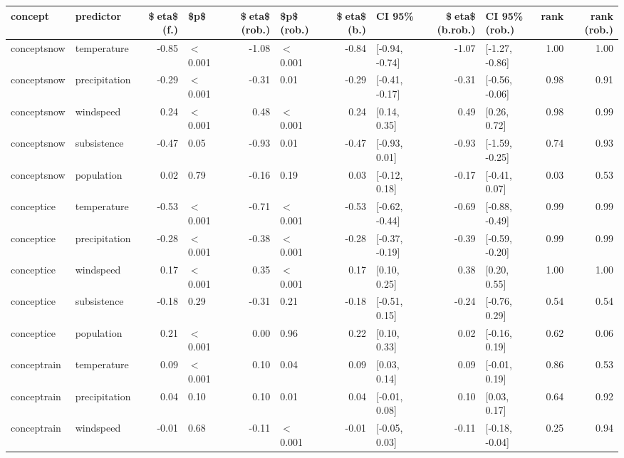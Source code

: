 \begin{table}[ht]
\centering
\begin{tabular}{llrlrlrlrlrr}
  \hline
concept & predictor & \$eta\$ (f.) & \$p\$ & \$eta\$ (rob.) & \$p\$ (rob.) & \$eta\$ (b.) & CI 95\% & \$eta\$ (b.rob.) & CI 95\% (rob.) & rank & rank (rob.) \\ 
  \hline
conceptsnow & temperature & -0.85 & $<$ 0.001 & -1.08 & $<$ 0.001 & -0.84 & [-0.94, -0.74] & -1.07 & [-1.27, -0.86] & 1.00 & 1.00 \\ 
  conceptsnow & precipitation & -0.29 & $<$ 0.001 & -0.31 & 0.01 & -0.29 & [-0.41, -0.17] & -0.31 & [-0.56, -0.06] & 0.98 & 0.91 \\ 
  conceptsnow & windspeed & 0.24 & $<$ 0.001 & 0.48 & $<$ 0.001 & 0.24 & [0.14, 0.35] & 0.49 & [0.26, 0.72] & 0.98 & 0.99 \\ 
  conceptsnow & subsistence & -0.47 & 0.05 & -0.93 & 0.01 & -0.47 & [-0.93, 0.01] & -0.93 & [-1.59, -0.25] & 0.74 & 0.93 \\ 
  conceptsnow & population & 0.02 & 0.79 & -0.16 & 0.19 & 0.03 & [-0.12, 0.18] & -0.17 & [-0.41, 0.07] & 0.03 & 0.53 \\ 
  conceptice & temperature & -0.53 & $<$ 0.001 & -0.71 & $<$ 0.001 & -0.53 & [-0.62, -0.44] & -0.69 & [-0.88, -0.49] & 0.99 & 0.99 \\ 
  conceptice & precipitation & -0.28 & $<$ 0.001 & -0.38 & $<$ 0.001 & -0.28 & [-0.37, -0.19] & -0.39 & [-0.59, -0.20] & 0.99 & 0.99 \\ 
  conceptice & windspeed & 0.17 & $<$ 0.001 & 0.35 & $<$ 0.001 & 0.17 & [0.10, 0.25] & 0.38 & [0.20, 0.55] & 1.00 & 1.00 \\ 
  conceptice & subsistence & -0.18 & 0.29 & -0.31 & 0.21 & -0.18 & [-0.51, 0.15] & -0.24 & [-0.76, 0.29] & 0.54 & 0.54 \\ 
  conceptice & population & 0.21 & $<$ 0.001 & 0.00 & 0.96 & 0.22 & [0.10, 0.33] & 0.02 & [-0.16, 0.19] & 0.62 & 0.06 \\ 
  conceptrain & temperature & 0.09 & $<$ 0.001 & 0.10 & 0.04 & 0.09 & [0.03, 0.14] & 0.09 & [-0.01, 0.19] & 0.86 & 0.53 \\ 
  conceptrain & precipitation & 0.04 & 0.10 & 0.10 & 0.01 & 0.04 & [-0.01, 0.08] & 0.10 & [0.03, 0.17] & 0.64 & 0.92 \\ 
  conceptrain & windspeed & -0.01 & 0.68 & -0.11 & $<$ 0.001 & -0.01 & [-0.05, 0.03] & -0.11 & [-0.18, -0.04] & 0.25 & 0.94 \\ 

\end{tabular}
\end{table}
